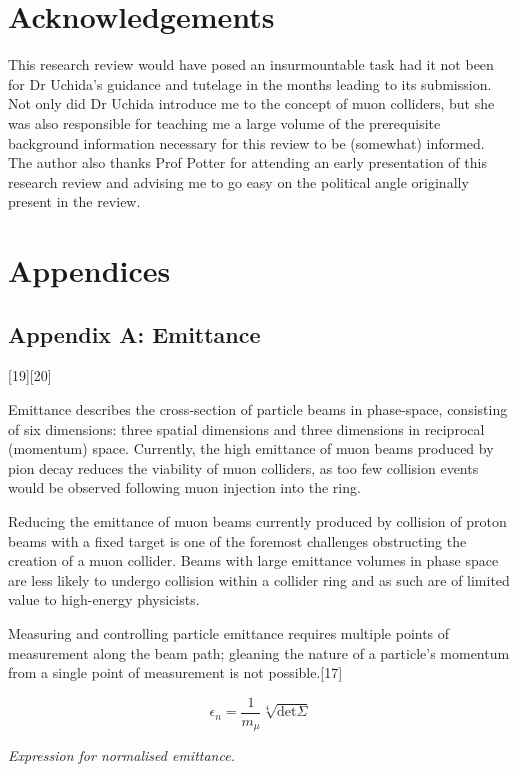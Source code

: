 \documentclass{article}
\begin{document}
	
	\section{Acknowledgements}
	\par This research review would have posed an insurmountable task had it not been for Dr Uchida’s guidance and tutelage in the months leading to its submission. Not only did Dr Uchida introduce me to the concept of muon colliders, but she was also responsible for teaching me a large volume of the prerequisite background information necessary for this review to be (somewhat) informed. The author also thanks Prof Potter for attending an early presentation of this research review and advising me to go easy on the political angle originally present in the review.
	
	
	\section{Appendices}
	
	\subsection{Appendix A: Emittance}[19][20]
	\par Emittance describes the cross-section of particle beams in phase-space, consisting of six dimensions: three spatial dimensions and three dimensions in reciprocal (momentum) space. Currently, the high emittance of muon beams produced by pion decay reduces the viability of muon colliders, as too few collision events would be observed following muon injection into the ring.
	\par Reducing the emittance of muon beams currently produced by collision of proton beams with a fixed target is one of the foremost challenges obstructing the creation of a muon collider. Beams with large emittance volumes in phase space are less likely to undergo collision within a collider ring and as such are of limited value to high-energy physicists.
	\par Measuring and controlling particle emittance requires multiple points of measurement along the beam path; gleaning the nature of a particle’s momentum from a single point of measurement is not possible.[17]
	
	$$\epsilon_{n} = \frac{1}{m_\mu}\sqrt[4]{\textrm{det}\Sigma}$$
	\begin{center}
		\par \textit{Expression for normalised emittance.}
	\end{center}
	
\end{document}
